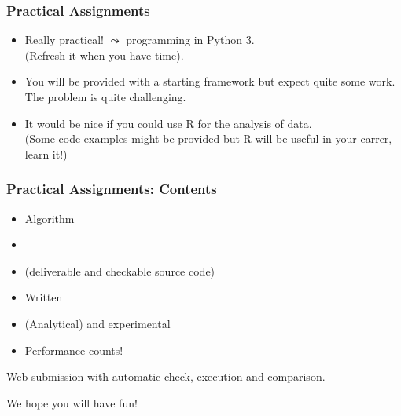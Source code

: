 \documentclass[handout,usepdftitle=false,aspectratio=169,smaller,compress,sans,fleqn,xcolor=dvipsnames,fleqn,table]{beamer}
\begin{document}
\begin{frame}%
  \frametitle{Practical Assignments}

  \medskip\begin{itemize}\itemsep=3ex
    \item  Really practical! $\leadsto$ programming in Python 3.\\
 (Refresh it when you have time).

\item You will be provided with a starting framework but expect quite
  some work. The problem is quite challenging.


\item It would be nice if you could use R for the analysis of
  data.\\ (Some code examples might be provided but R will be useful in
  your carrer, learn it!)
 
\end{itemize}
\end{frame}



\begin{frame}%
  \frametitle{Practical Assignments: Contents}



  \medskip\begin{itemize}\itemsep=3ex
\item Algorithm 
\item {}
\item {} (deliverable and checkable source code)
\item Written 
\item (Analytical) and experimental 
\item Performance counts!
\end{itemize}

\pause
\bigskip
Web submission with automatic check, execution and comparison.

\bigskip
We hope you will have fun!
\end{frame}
\end{document}
